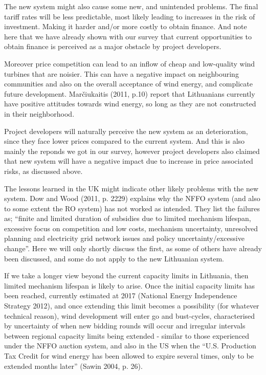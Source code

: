 \documentclass[a4paper, 12pt]{article}
\begin{document}
The new system might also cause some new, and unintended problems. The final tariff rates will be less predictable, most likely leading to increases in the risk of investment. Making it harder and/or more costly to obtain finance. And note here that we have already shown with our survey that current opportunities to obtain finance is perceived as a major obstacle by project developers.

Moreover price competition can lead to an inflow of cheap and low-quality wind turbines that are noisier. This can have a negative impact on neighbouring communities and also on the overall acceptance of wind energy, and complicate future development. Marčiukaitis (2011, p.10) report that Lithuanians currently have positive attitudes towards wind energy, so long as they are not constructed in their neighborhood. 

Project developers will naturally perceive the new system as an deterioration, since they face lower prices compared to the current system. And this is also mainly the reponds we got in our survey, however project developers also claimed that new system will have a negative impact due to increase in price associated risks, as discussed above. 

The lessons learned in the UK might indicate other likely problems with the new system. Dow and Wood (2011, p. 2229) explains why the NFFO system (and also to some extent the RO system) has not worked as intended. They list the failures as; ``finite and limited duration of subsidies due to limited mechanism lifespan, excessive focus on competition and low costs, mechanism uncertainty, unresolved planning and electricity grid network issues and policy uncertainty/excessive change''. Here we will only shortly discuss the first, as some of others have already been discussed, and some do not apply to the new Lithuanian system. 

If we take a longer view beyond the current capacity limits in Lithuania, then limited mechanism lifespan is likely to arise. Once the initial capacity limits has been reached, currently estimated at 2017 (National Energy Independence Strategy 2012), and once extending this limit becomes a possibility (for whatever technical reason), wind development will enter go and bust-cycles, characterised by uncertainty of when new bidding rounds will occur and irregular intervals between regional capacity limits being extended - similar to those experienced under the NFFO auction system, and also in the US when the ``U.S. Production Tax Credit for wind energy has been allowed to expire several times, only to be extended months later'' (Sawin 2004, p. 26). 
\end{document}
